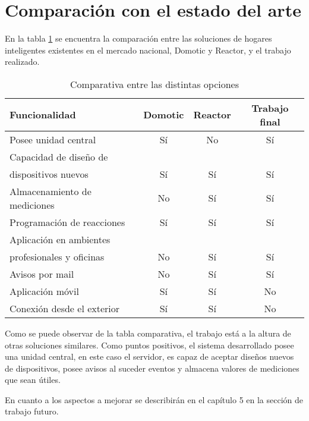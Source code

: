 \section{Comparación con el estado del arte}

En la tabla \ref{tab:estadoarte} se encuentra la comparación entre las soluciones de hogares inteligentes existentes en el mercado nacional, Domotic y Reactor, y el trabajo realizado. 

\begin{table}[h]
\centering
\caption[Estado arte mercado nacional]{Comparativa entre las distintas opciones}
\begin{tabular}{l c c c}
\toprule
\textbf{Funcionalidad} & \textbf{Domotic} & \textbf{Reactor} & \textbf{Trabajo final}\\
\midrule
Posee unidad central			& Sí		& No		& Sí\\
Capacidad de diseño de		&		&		&\\
dispositivos nuevos			& Sí		& Sí		& Sí\\
Almacenamiento de mediciones	& No		& Sí		& Sí\\
Programación de reacciones	& Sí		& Sí		& Sí\\
Aplicación en ambientes		&		&		&\\
profesionales y oficinas		& No		& Sí		& Sí\\
Avisos por mail				& No		& Sí		& Sí\\
Aplicación móvil				& Sí		& Sí		& No\\
Conexión	 desde el exterior	& Sí		& Sí		& No\\
\bottomrule
\hline
\end{tabular}
\label{tab:estadoarte}
\end{table}

Como se puede observar de la tabla comparativa, el trabajo está a la altura de otras soluciones similares. Como puntos positivos, el sistema desarrollado posee una unidad central, en este caso el servidor, es capaz de aceptar diseños nuevos de dispositivos, posee avisos al suceder eventos y almacena valores de mediciones que sean útiles.

En cuanto a los aspectos a mejorar se describirán en el capítulo 5 en la sección de trabajo futuro.